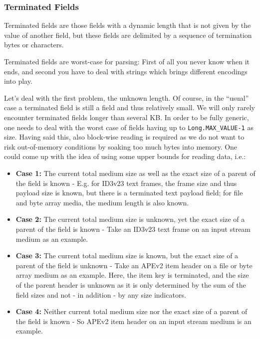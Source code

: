 \subsubsection{Terminated Fields}%
\label{sec:TerminatedFields}%

Terminated fields are those fields with a dynamic length that is not given by the value of another field, but these fields are delimited by a sequence of termination bytes or characters. 

Terminated fields are worst-case for parsing: First of all you never know when it ends, and second you have to deal with strings which brings different encodings into play.

Let's deal with the first problem, the unknown length. Of course, in the ``usual'' case a terminated field is still a field and thus relatively small. We will only rarely encounter terminated fields longer than several KB. In order to be fully generic, one needs to deal with the worst case of fields having up to \texttt{Long.MAX\_VALUE-1} as size. Having said this, also block-wise reading is required as we do not want to risk out-of-memory conditions by soaking too much bytes into memory. One could come up with the idea of using some upper bounds for reading data, i.e.:
\begin{itemize}
\item \textbf{Case 1:} The current total medium size as well as the exact size of a parent of the field is known - E.g. for ID3v23 text frames, the frame size and thus payload size is known, but there is a terminated text payload field; for file and byte array media, the medium length is also known.
\item \textbf{Case 2:} The current total medium size is unknown, yet the exact size of a parent of the field is known - Take an ID3v23 text frame on an input stream medium as an example.
\item \textbf{Case 3:} The current total medium size is known, but the exact size of a parent of the field is unknown - Take an APEv2 item header on a file or byte array medium as an example. Here, the item key is terminated, and the size of the parent header is unknown as it is only determined by the sum of the field sizes and not - in addition - by any size indicators.
\item \textbf{Case 4:} Neither current total medium size nor the exact size of a parent of the field is known - So APEv2 item header on an input stream medium is an example.
\end{itemize}

